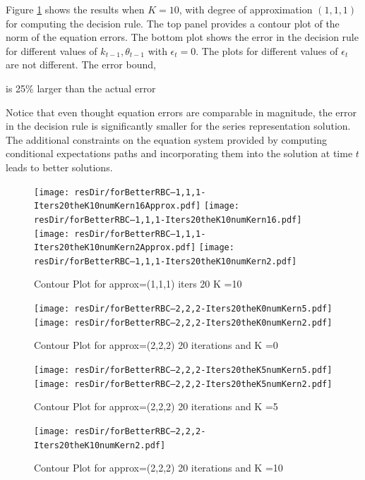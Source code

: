 \documentclass[12pt]{article}
\begin{document}
Figure \ref{fig:cntpltC} shows the results when $K=10$, with degree of approximation $(1,1,1)$
for computing the decision rule.  The top panel provides a contour plot of the
norm of the equation errors. The bottom plot shows the error in the decision rule for different values of $k_{t-1}, \theta_{t-1}$ with $\epsilon_t=0$.  The plots for different values of $\epsilon_t$ are not different.  The error bound, 
\ifmacosx
 
\fi
is 25\% larger than the actual error 
\iflinux
 
\fi
 Notice that even thought equation errors are comparable in magnitude, the error in the decision rule is significantly smaller for the series representation solution.  The additional constraints on the equation system provided by computing conditional expectations paths and incorporating them into the solution at time $t$ leads to better solutions.



\begin{figure}
  \centering
\iflinux
  \texttt{[image: resDir/forBetterRBC--1,1,1-Iters20theK10numKern16Approx.pdf]}
  \texttt{[image: resDir/forBetterRBC--1,1,1-Iters20theK10numKern16.pdf]}
\fi
\ifmacosx
  \texttt{[image: resDir/forBetterRBC--1,1,1-Iters20theK10numKern2Approx.pdf]}
  \texttt{[image: resDir/forBetterRBC--1,1,1-Iters20theK10numKern2.pdf]}
\fi
  \caption{Contour Plot for approx=(1,1,1) iters 20 K =10}
  \label{fig:cntpltC}
\end{figure}

\begin{figure}
  \centering
\iflinux  
\texttt{[image: resDir/forBetterRBC--2,2,2-Iters20theK0numKern5.pdf]}
\fi
\ifmacosx  
\texttt{[image: resDir/forBetterRBC--2,2,2-Iters20theK0numKern2.pdf]}
\fi
  \caption{Contour Plot for approx=(2,2,2) 20 iterations and K =0}
  \label{fig:cntpltD}
\end{figure}

\begin{figure}
  \centering
\iflinux
  \texttt{[image: resDir/forBetterRBC--2,2,2-Iters20theK5numKern5.pdf]}
\fi
\ifmacosx  
\texttt{[image: resDir/forBetterRBC--2,2,2-Iters20theK5numKern2.pdf]}
\fi
  \caption{Contour Plot for approx=(2,2,2) 20 iterations and K =5}
  \label{fig:cntpltE}
\end{figure}

\begin{figure}
  \centering
\ifmacosx
  \texttt{[image: resDir/forBetterRBC--2,2,2-Iters20theK10numKern2.pdf]}
\fi
  \caption{Contour Plot for approx=(2,2,2) 20 iterations and K =10}
  \label{fig:cntpltF}
\end{figure}
\end{document}
